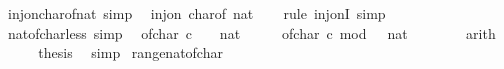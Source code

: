 \begin{isabellebody}
\endisatagproof
{\isafoldproof}%
%
\isadelimproof
\isanewline
%
\endisadelimproof
\isanewline
{}\isamarkupfalse%
\isanewline
\isanewline
{}\isamarkupfalse%
\ inj{\isacharunderscore}{\kern0pt}on{\isacharunderscore}{\kern0pt}char{\isacharunderscore}{\kern0pt}of{\isacharunderscore}{\kern0pt}nat\ {\isacharbrackleft}{\kern0pt}simp{\isacharbrackright}{\kern0pt}{\isacharcolon}{\kern0pt}\isanewline
\ \ {\isachardoublequoteopen}inj{\isacharunderscore}{\kern0pt}on\ char{\isacharunderscore}{\kern0pt}of\ {\isacharbraceleft}{\kern0pt}{}{\isacharcolon}{\kern0pt}{\isacharcolon}{\kern0pt}nat{\isachardot}{\kern0pt}{\isachardot}{\kern0pt}{\isacharless}{\kern0pt}{}{}{}{\isacharbraceright}{\kern0pt}{\isachardoublequoteclose}\isanewline
%
\isadelimproof
\ \ %
\endisadelimproof
%
\isatagproof
{}\isamarkupfalse%
\ {\isacharparenleft}{\kern0pt}rule\ inj{\isacharunderscore}{\kern0pt}onI{\isacharparenright}{\kern0pt}\ simp%
\endisatagproof
{\isafoldproof}%
%
\isadelimproof
\isanewline
%
\endisadelimproof
\isanewline
{}\isamarkupfalse%
\ nat{\isacharunderscore}{\kern0pt}of{\isacharunderscore}{\kern0pt}char{\isacharunderscore}{\kern0pt}less{\isacharunderscore}{\kern0pt}{}{}{}\ {\isacharbrackleft}{\kern0pt}simp{\isacharbrackright}{\kern0pt}{\isacharcolon}{\kern0pt}\isanewline
\ \ {\isachardoublequoteopen}of{\isacharunderscore}{\kern0pt}char\ c\ {\isacharless}{\kern0pt}\ {\isacharparenleft}{\kern0pt}{}{}{}\ {\isacharcolon}{\kern0pt}{\isacharcolon}{\kern0pt}\ nat{\isacharparenright}{\kern0pt}{\isachardoublequoteclose}\isanewline
%
\isadelimproof
%
\endisadelimproof
%
\isatagproof
{}\isamarkupfalse%
\ {\isacharminus}{\kern0pt}\isanewline
\ \ \isamarkupfalse%
\ {\isachardoublequoteopen}of{\isacharunderscore}{\kern0pt}char\ c\ mod\ {\isacharparenleft}{\kern0pt}{}{}{}\ {\isacharcolon}{\kern0pt}{\isacharcolon}{\kern0pt}\ nat{\isacharparenright}{\kern0pt}\ {\isacharless}{\kern0pt}\ {}{}{}{\isachardoublequoteclose}\isanewline
\ \ \ \ \isamarkupfalse%
\ arith\isanewline
\ \ \isamarkupfalse%
\ \isamarkupfalse%
\ {\isacharquery}{\kern0pt}thesis\ \isamarkupfalse%
\ simp\isanewline
{}\isamarkupfalse%
%
\endisatagproof
{\isafoldproof}%
%
\isadelimproof
\isanewline
%
\endisadelimproof
\isanewline
{}\isamarkupfalse%
\ range{\isacharunderscore}{\kern0pt}nat{\isacharunderscore}{\kern0pt}of{\isacharunderscore}{\kern0pt}char{\isacharcolon}{\kern0pt}\isanewline

\end{isabellebody}
